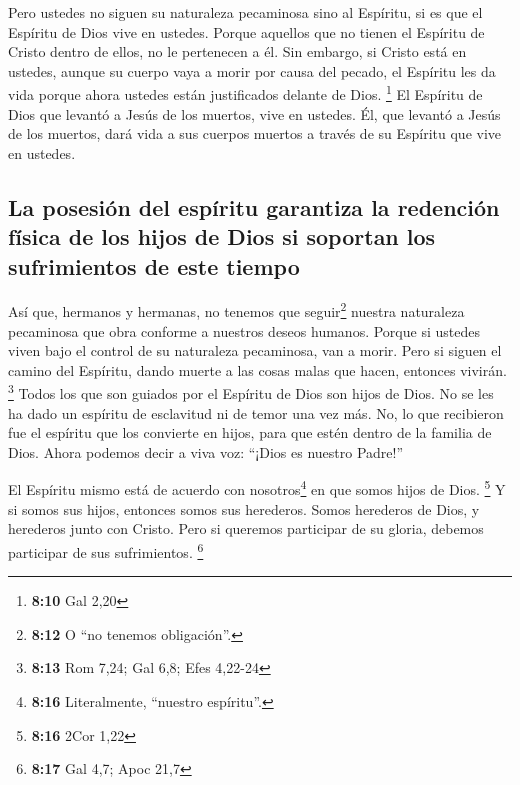  Pero ustedes no siguen su naturaleza pecaminosa sino al
Espíritu, si es que el Espíritu de Dios vive en ustedes. Porque aquellos
que no tienen el Espíritu de Cristo dentro de ellos, no le pertenecen a
él.  Sin embargo, si Cristo está en ustedes, aunque su
cuerpo vaya a morir por causa del pecado, el Espíritu les da vida porque
ahora ustedes están justificados delante de Dios. \footnote{\textbf{8:10}
  Gal 2,20}  El Espíritu de Dios que levantó a Jesús de
los muertos, vive en ustedes. Él, que levantó a Jesús de los muertos,
dará vida a sus cuerpos muertos a través de su Espíritu que vive en
ustedes.

\hypertarget{la-posesiuxf3n-del-espuxedritu-garantiza-la-redenciuxf3n-fuxedsica-de-los-hijos-de-dios-si-soportan-los-sufrimientos-de-este-tiempo}{%
\subsection{La posesión del espíritu garantiza la redención física de
los hijos de Dios si soportan los sufrimientos de este
tiempo}\label{la-posesiuxf3n-del-espuxedritu-garantiza-la-redenciuxf3n-fuxedsica-de-los-hijos-de-dios-si-soportan-los-sufrimientos-de-este-tiempo}}

 Así que, hermanos y hermanas, no tenemos que
seguir\footnote{\textbf{8:12} O ``no tenemos obligación''.} nuestra
naturaleza pecaminosa que obra conforme a nuestros deseos humanos.
 Porque si ustedes viven bajo el control de su naturaleza
pecaminosa, van a morir. Pero si siguen el camino del Espíritu, dando
muerte a las cosas malas que hacen, entonces vivirán. \footnote{\textbf{8:13}
  Rom 7,24; Gal 6,8; Efes 4,22-24}  Todos los que son
guiados por el Espíritu de Dios son hijos de Dios.  No se
les ha dado un espíritu de esclavitud ni de temor una vez más. No, lo
que recibieron fue el espíritu que los convierte en hijos, para que
estén dentro de la familia de Dios. Ahora podemos decir a viva voz:
``¡Dios es nuestro Padre!''

 El Espíritu mismo está de acuerdo con
nosotros\footnote{\textbf{8:16} Literalmente, ``nuestro espíritu''.} en
que somos hijos de Dios. \footnote{\textbf{8:16} 2Cor 1,22}
 Y si somos sus hijos, entonces somos sus herederos.
Somos herederos de Dios, y herederos junto con Cristo. Pero si queremos
participar de su gloria, debemos participar de sus sufrimientos.
\footnote{\textbf{8:17} Gal 4,7; Apoc 21,7}

